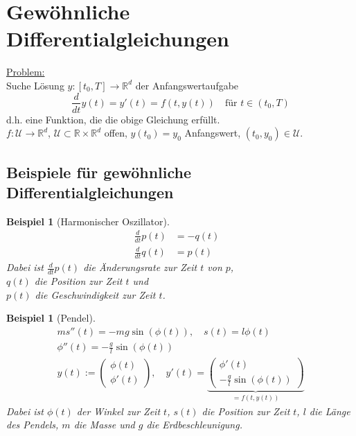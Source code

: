 \documentclass[12pt]{article}
\theoremstyle{break}
\newtheorem{example}[theorem]{Beispiel}
\begin{document}
\section{Gewöhnliche Differentialgleichungen}
\underline{Problem:}\\
Suche Lösung  $y\colon [t_0, T] \rightarrow \mathbb{R}^d$ der Anfangswertaufgabe
$$\frac{d}{dt} y(t) = y'(t) = f(t, y(t)) \quad \text{für $t \in (t_0, T)$}$$
d.h. eine Funktion, die die obige Gleichung erfüllt. \\
$f: \mathcal{U} \rightarrow \mathbb{R}^d$, $\mathcal{U} \subset \mathbb{R}\times\mathbb{R}^d$ offen, $y(t_0) = y_0$ Anfangswert, $(t_0, y_0) \in \mathcal{U}$.

\subsection{Beispiele für gewöhnliche Differentialgleichungen}
\begin{example}[Harmonischer Oszillator] \leavevmode
\begin{align*}
\frac{d}{dt}p(t) &= -q(t) &\\
\frac{d}{dt}q(t) &= p(t)
\end{align*}
Dabei ist $\frac{d}{dt}p(t)$ die Änderungsrate zur Zeit $t$ von $p$, \\
$q(t)$ die Position zur Zeit $t$ und \\
$p(t)$ die Geschwindigkeit zur Zeit $t$.
\end{example}

\begin{example}[Pendel]
\begin{align*}
&ms''(t) = -mg\sin(\phi(t)), \quad s(t) = l\phi(t) &\\
&\phi''(t) = - \frac{g}{l} \sin(\phi(t)) &\\
&y(t) := \left( \begin{matrix} \phi(t) \\ \phi'(t) \end{matrix} \right), \quad y'(t) = \underbrace{\left( \begin{matrix} \phi'(t) \\ -\frac{g}{l}\sin(\phi(t)) \end{matrix} \right)}_{= f(t, y(t))}
\end{align*}
Dabei ist $\phi(t)$ der Winkel zur Zeit $t$, $s(t)$ die Position zur Zeit $t$, $l$ die Länge des Pendels, $m$ die Masse und $g$ die Erdbeschleunigung.
\end{example}
\end{document}
